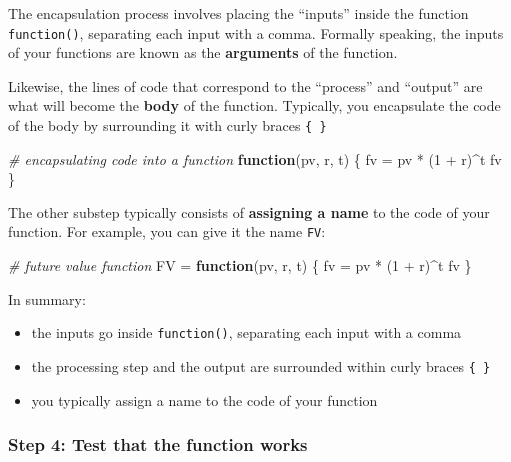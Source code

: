 \documentclass[
]{book}
\newenvironment{Shaded}{\begin{snugshade}}{\end{snugshade}}
\newcommand{\CommentTok}[1]{\textcolor[rgb]{0.56,0.35,0.01}{\textit{#1}}}
\newcommand{\ControlFlowTok}[1]{\textcolor[rgb]{0.13,0.29,0.53}{\textbf{#1}}}
\newcommand{\DecValTok}[1]{\textcolor[rgb]{0.00,0.00,0.81}{#1}}
\newcommand{\NormalTok}[1]{#1}
\newcommand{\OtherTok}[1]{\textcolor[rgb]{0.56,0.35,0.01}{#1}}
\newcommand{\SpecialCharTok}[1]{\textcolor[rgb]{0.00,0.00,0.00}{#1}}
\begin{document}
The encapsulation process involves placing the ``inputs'' inside the function
\texttt{function()}, separating each input with a comma. Formally speaking, the
inputs of your functions are known as the \textbf{arguments} of the function.

Likewise, the lines of code that correspond to the ``process'' and ``output'' are
what will become the \textbf{body} of the function. Typically, you encapsulate the
code of the body by surrounding it with curly braces \texttt{\{\ \}}

\begin{Shaded}
\begin{Highlighting}[]
\CommentTok{\# encapsulating code into a function}
\ControlFlowTok{function}\NormalTok{(pv, r, t) \{}
\NormalTok{  fv }\OtherTok{=}\NormalTok{ pv }\SpecialCharTok{*}\NormalTok{ (}\DecValTok{1} \SpecialCharTok{+}\NormalTok{ r)}\SpecialCharTok{\^{}}\NormalTok{t}
\NormalTok{  fv}
\NormalTok{\}}
\end{Highlighting}
\end{Shaded}

The other substep typically consists of \textbf{assigning a name} to the code of
your function. For example, you can give it the name \texttt{FV}:

\begin{Shaded}
\begin{Highlighting}[]
\CommentTok{\# future value function}
\NormalTok{FV }\OtherTok{=} \ControlFlowTok{function}\NormalTok{(pv, r, t) \{}
\NormalTok{  fv }\OtherTok{=}\NormalTok{ pv }\SpecialCharTok{*}\NormalTok{ (}\DecValTok{1} \SpecialCharTok{+}\NormalTok{ r)}\SpecialCharTok{\^{}}\NormalTok{t}
\NormalTok{  fv}
\NormalTok{\}}
\end{Highlighting}
\end{Shaded}

In summary:

\begin{itemize}
\item
  the inputs go inside \texttt{function()}, separating each input with a comma
\item
  the processing step and the output are surrounded within curly braces \texttt{\{\ \}}
\item
  you typically assign a name to the code of your function
\end{itemize}

\hypertarget{step-4-test-that-the-function-works}{%
\subsubsection*{Step 4: Test that the function works}\label{step-4-test-that-the-function-works}}
\end{document}
